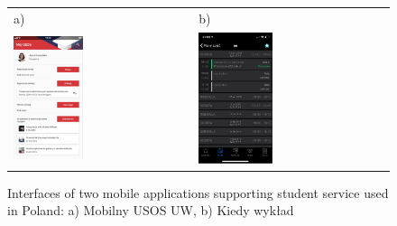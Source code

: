 \begin{figure}[htb]
    \centering
    \begin{tabular}{@{}ll@{}}
        a) & b) \\
        \includegraphics[width=0.4\textwidth]{fig01/mobilny-usos.png} &
        \includegraphics[width=0.4\textwidth]{fig01/kiedy-wyklad.png} \\
    \end{tabular}
    \caption{Interfaces of two mobile applications supporting student service used in Poland: a) Mobilny USOS UW, b) Kiedy wykład} \label{fig:similar-solutions}
\end{figure}

